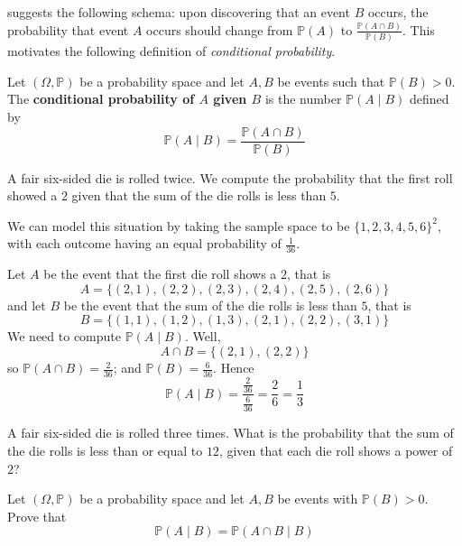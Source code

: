  suggests the following schema: upon discovering that an event $B$ occurs, the probability that event $A$ occurs should change from $\mathbb{P}(A)$ to $\frac{\mathbb{P}(A \cap B)}{\mathbb{P}(B)}$. This motivates the following definition of \textit{conditional probability}.

\begin{definition}
\label{defConditionalProbability}
Let $(\Omega,\mathbb{P})$ be a probability space and let $A,B$ be events such that $\mathbb{P}(B)>0$. The \textbf{conditional probability of $A$ given $B$} is the number $\mathbb{P}(A \mid B)$  defined by
\[ \mathbb{P}(A \mid B) = \frac{\mathbb{P}(A \cap B)}{\mathbb{P}(B)} \]
\end{definition}

\begin{example}
A fair six-sided die is rolled twice. We compute the probability that the first roll showed a $2$ given that the sum of the die rolls is less than $5$.

We can model this situation by taking the sample space to be $\{ 1, 2, 3, 4, 5, 6 \}^2$, with each outcome having an equal probability of $\frac{1}{36}$.

Let $A$ be the event that the first die roll shows a $2$, that is
\[ A = \{ (2,1),(2,2),(2,3),(2,4),(2,5),(2,6) \} \]
and let $B$ be the event that the sum of the die rolls is less than $5$, that is
\[ B = \{ (1,1),(1,2),(1,3),(2,1),(2,2),(3,1) \} \]
We need to compute $\mathbb{P}(A \mid B)$. Well,
\[ A \cap B = \{ (2,1), (2,2) \} \]
so $\mathbb{P}(A \cap B) = \frac{2}{36}$; and $\mathbb{P}(B) = \frac{6}{36}$. Hence
\[ \mathbb{P}(A \mid B) = \frac{\frac{2}{36}}{\frac{6}{36}} = \frac{2}{6} = \frac{1}{3} \]
\end{example}

\begin{exercise}
A fair six-sided die is rolled three times. What is the probability that the sum of the die rolls is less than or equal to $12$, given that each die roll shows a power of $2$?
\end{exercise}

\begin{exercise}
\label{exConditionalProbabilityOfIntersection}
Let $(\Omega,\mathbb{P})$ be a probability space and let $A,B$ be events with $\mathbb{P}(B)>0$. Prove that
\[ \mathbb{P}(A \mid B) = \mathbb{P}(A \cap B \mid B) \]
\end{exercise}

